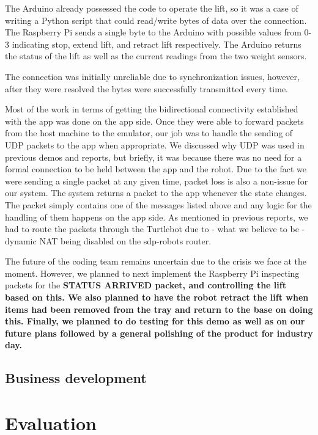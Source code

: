 \documentclass{article}
\begin{document}
The Arduino already possessed the code to operate the lift, so it was a case of writing a Python script that could read/write bytes of data over the connection. The Raspberry Pi sends a single byte to the Arduino with possible values from 0-3 indicating stop, extend lift, and retract lift respectively. The Arduino returns the status of the lift as well as the current readings from the two weight sensors.

The connection was initially unreliable due to synchronization issues, however, after they were resolved the bytes were successfully transmitted every time.

Most of the work in terms of getting the bidirectional connectivity established with the app was done on the app side. Once they were able to forward packets from the host machine to the emulator, our job was to handle the sending of UDP packets to the app when appropriate. We discussed why UDP was used in previous demos and reports, but briefly, it was because there was no need for a formal connection to be held between the app and the robot. Due to the fact we were sending a single packet at any given time, packet loss is also a non-issue for our system. The system returns a packet to the app whenever the state changes. The packet simply contains one of the messages listed above and any logic for the handling of them happens on the app side. As mentioned in previous reports, we had to route the packets through the Turtlebot due to - what we believe to be - dynamic NAT being disabled on the sdp-robots router.

The future of the coding team remains uncertain due to the crisis we face at the moment. However, we planned to next implement the Raspberry Pi inspecting packets for the \bf{STATUS ARRIVED} packet, and controlling the lift based on this. We also planned to have the robot retract the lift when items had been removed from the tray and return to the base on doing this. Finally, we planned to do testing for this demo as well as on our future plans followed by a general polishing of the product for industry day.

\subsection{Business development}

\section{Evaluation}
\end{document}
